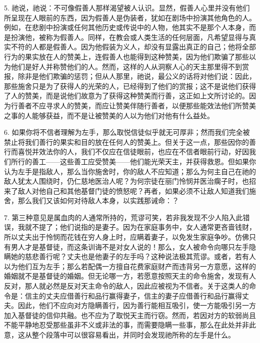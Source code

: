 5. 祂说，祂说：不可像假善人那样渴望被人认识。显然，假善人心里并没有他们所呈现在人眼前的东西，因为假善人是伪装者，犹如在剧场中扮演其他角色的人。例如，在悲剧中扮演或任何其他历史或传说中的人物，他其实不是那个人本身，而是扮演他，被称为假善人。同样，在教会或人类生活的任何层面，凡希望显得与真实不符的人都是假善人。因为他假装为义人，却没有显露出真正的自己；他将全部行为的果实放在人的赞美上，连假善人也能得到这种赞美，因为他们欺骗了那些以为他们是好人并称赞他们的人。然而，这样的人从洞察人心的天主那里得不到赏报，除非是他们欺骗的惩罚；但从人那里，祂说，最公义的话将对他们说：因此，那些施舍只是为了获得人的光荣的人，已经得到了他们的赏报；这不是说他们获得了人的赞美，而是说他们故意为了获得这种赞美而行善，这正如上文所讨论的。因为行善者不应寻求人的赞美，而应让赞美伴随行善者，以便那些能效法他们所赞美之事的人能够获益，而不是让被赞美的人以为他们对他有什么益处。\par

6. 如果你将不信者理解为左手，那么取悦信徒似乎就无可厚非；然而我们完全被禁止将我们善行的果实和目的放在任何人的赞美上。但关于这一点，那些因你的善行而喜悦并效法你的人，我们不仅应在信徒眼前，也应在不信者眼前行动，好因我们所行的善工——这些善工应受赞美——他们能光荣天主，并获得救恩。但如果你认为左手是指敌人，那么当你施舍时，你的敌人不应知道；那么为何主自己在祂的敌人犹太人围绕时，仍仁慈地医治人呢？为何宗徒在丽门怜悯并医治瘸子时，也招来了敌人对他自己和其他基督门徒的愤怒呢？再者，如果必须不让敌人知道我们施舍，那么我们又该如何对待敌人本身，以实践那诫命：？\par

7. 第三种意见是属血肉的人通常所持的，荒谬可笑，若非我发现不少人陷入此错误，我就不提了；他们说指的是妻子。因为在家庭事务中，女人通常更吝啬钱财，所以丈夫出于怜悯而花钱在穷人身上时，应瞒着妻子，以免发生家庭争吵。仿佛只有男人才是基督徒，而这条训诲不是对女人说的！那么，女人被命令向哪只左手隐瞒她的慈悲善行呢？丈夫也是他妻子的左手吗？这种说法极其荒谬。或者，若有人以为他们互为左手；那么若配偶一方擅自花费家庭财产而违背另一方意愿，这样的婚姻就不是基督徒的婚姻。但无论哪一方，若愿意按照天主的命令施舍，发现有人反对，那人就必然是反对天主命令的敌人，因此应被视为不信者。关于这类人的命令是：信主的丈夫应借善行和品行赢得妻子，信主的妻子应借善行和品行赢得丈夫。因此，他们不应向对方隐瞒善行，因为善行能相互吸引，使一方能吸引另一方加入基督徒的信仰共融。也不应为了取悦天主而行窃。然而，若因对方的软弱尚且不能平静地忍受那些虽非不义或非法的事，而需要隐瞒一些事，那么在此处并非此意，这从整个段落中可以很容易看出，并同时会发现祂所称的左手是什么。\par

